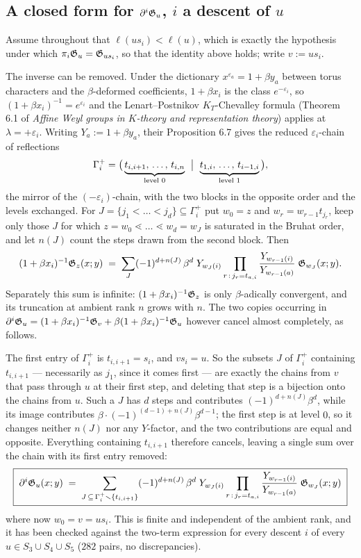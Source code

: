 \documentclass{amsart}
\theoremstyle{definition}
\theoremstyle{remark}
\numberwithin{equation}{section}
\begin{document}
\subsection*{A closed form for $\partial^i\mathfrak G_u$, $i$ a descent of $u$}

Assume throughout that $\ell(us_i)<\ell(u)$, which is exactly the hypothesis under which
$\pi_i\mathfrak G_u=\mathfrak G_{us_i}$, so that the identity above holds; write $v:=us_i$.

The inverse can be removed. Under the dictionary $x^{\varepsilon_a}=1+\beta y_a$ between
torus characters and the $\beta$-deformed coefficients, $1+\beta x_i$ is the class
$e^{-\varepsilon_i}$, so $(1+\beta x_i)^{-1}=e^{\varepsilon_i}$ and the Lenart--Postnikov
$K_T$-Chevalley formula (Theorem 6.1 of \emph{Affine Weyl groups in $K$-theory and
representation theory}) applies at $\lambda=+\varepsilon_i$. Writing $Y_a:=1+\beta y_a$,
their Proposition 6.7 gives the reduced $\varepsilon_i$-chain of reflections
$$\Gamma_i^{+}=\bigl(\,\underbrace{t_{i,i+1},\,\dots,\,t_{i,n}}_{\text{level }0}\ \bigm|\ \underbrace{t_{1,i},\,\dots,\,t_{i-1,i}}_{\text{level }1}\,\bigr),$$
the mirror of the $(-\varepsilon_i)$-chain, with the two blocks in the opposite order and the
levels exchanged. For $J=\{j_1<\dots<j_d\}\subseteq\Gamma_i^{+}$ put $w_0=z$ and
$w_r=w_{r-1}t_{j_r}$, keep only those $J$ for which $z=w_0\lessdot\dots\lessdot w_d=w_J$ is
saturated in the Bruhat order, and let $n(J)$ count the steps drawn from the second block.
Then
$$(1+\beta x_i)^{-1}\mathfrak G_z(x;y)\;=\;\sum_{J}(-1)^{d+n(J)}\,\beta^{d}\;Y_{w_J(i)}
  \prod_{r\,:\,j_r=t_{a,i}}\frac{Y_{w_{r-1}(i)}}{Y_{w_{r-1}(a)}}\;\mathfrak G_{w_J}(x;y).$$
Separately this sum is infinite: $(1+\beta x_i)^{-1}\mathfrak G_z$ is only $\beta$-adically
convergent, and its truncation at ambient rank $n$ grows with $n$. The two copies occurring
in $\partial^i\mathfrak G_u=(1+\beta x_i)^{-1}\mathfrak G_v+\beta(1+\beta x_i)^{-1}\mathfrak G_u$ however
cancel almost completely, as follows.

The first entry of $\Gamma_i^{+}$ is $t_{i,i+1}=s_i$, and $vs_i=u$. So the subsets $J$ of
$\Gamma_i^{+}$ containing $t_{i,i+1}$ --- necessarily as $j_1$, since it comes first ---
are exactly the chains from $v$ that pass through $u$ at their first step, and deleting that
step is a bijection onto the chains from $u$. Such a $J$ has $d$ steps and contributes
$(-1)^{d+n(J)}\beta^{d}$, while its image contributes $\beta\cdot(-1)^{(d-1)+n(J)}\beta^{d-1}$;
the first step is at level $0$, so it changes neither $n(J)$ nor any $Y$-factor, and the two
contributions are equal and opposite. Everything containing $t_{i,i+1}$ therefore cancels,
leaving a single sum over the chain with its first entry removed:
$$\boxed{\;\partial^i\mathfrak G_u(x;y)\;=\;\sum_{J\,\subseteq\,\Gamma_i^{+}\smallsetminus\{t_{i,i+1}\}}
  (-1)^{d+n(J)}\,\beta^{d}\;Y_{w_J(i)}
  \prod_{r\,:\,j_r=t_{a,i}}\frac{Y_{w_{r-1}(i)}}{Y_{w_{r-1}(a)}}\;\mathfrak G_{w_J}(x;y)\;}$$
where now $w_0=v=us_i$. This is finite and independent of the ambient rank, and it has been
checked against the two-term expression for every descent $i$ of every $u\in S_3\cup S_4\cup S_5$
($282$ pairs, no discrepancies).
\end{document}
